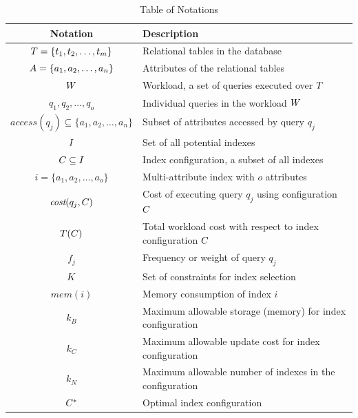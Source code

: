 \begin{table}[ht]
\centering
    \small
    \caption{Table of Notations}
    \def\arraystretch{1.25}
    \begin{tabular}{%
        c
        >{\raggedright\arraybackslash}p{80mm} %
    }
    \toprule
    \textbf{Notation} & \textbf{Description} \\
    \midrule
    $T = \{t_1, t_2, \dots, t_m\}$ & Relational tables in the database \\
    $A = \{a_1, a_2, \dots, a_n\}$ & Attributes of the relational tables \\ 
    $W$ & Workload, a set of queries executed over $T$\\ 
    $q_1, q_2, \dots, q_o$ & Individual queries in the workload $W$\\ 
    $\textit{access}(q_j) \subseteq \{ a_1, a_2, \dots, a_n \}$ & Subset of attributes accessed by query $q_j$ \\ 
    $I$ & Set of all potential indexes \\ 
    $C \subseteq I$ & Index configuration, a subset of all indexes \\ 
    $i = \{ a_1, a_2, \dots, a_o \}$ & Multi-attribute index with $o$ attributes \\ 
    $\textit{cost}(q_j, C)$ & Cost of executing query $q_j$ using configuration $C$ \\ 
    $T(C)$ & Total workload cost with respect to index configuration $C$ \\ 
    $f_j$ & Frequency or weight of query $q_j$ \\ 
    $K$ & Set of constraints for index selection \\ 
    $\textit{mem}(i)$ & Memory consumption of index $i$ \\ 
    $k_B$ & Maximum allowable storage (memory) for index configuration \\ 
    $k_C$ & Maximum allowable update cost for index configuration \\ 
    $k_N$ & Maximum allowable number of indexes in the configuration \\ 
    $C^*$ & Optimal index configuration \\ 
    \bottomrule
    \end{tabular}
\end{table}

